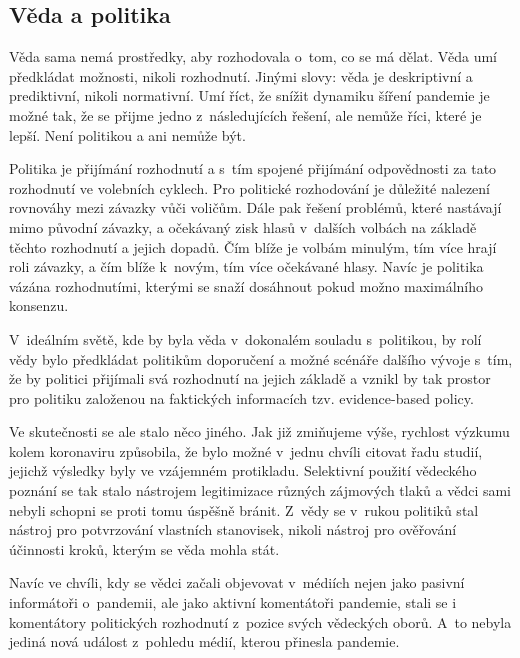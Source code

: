 \subsection*{Věda a politika}

Věda sama nemá prostředky, aby rozhodovala o~tom, co se má dělat. Věda umí předkládat možnosti, nikoli rozhodnutí. Jinými slovy: věda je deskriptivní a prediktivní, nikoli normativní. Umí říct, že snížit dynamiku šíření pandemie je možné tak, že se přijme jedno z~následujících řešení, ale nemůže říci, které je lepší. Není politikou a ani nemůže být.

Politika je přijímání rozhodnutí a s~tím spojené přijímání odpovědnosti za tato rozhodnutí ve volebních cyklech. Pro politické rozhodování je důležité nalezení rovnováhy mezi závazky vůči voličům. Dále pak řešení problémů, které nastávají mimo původní závazky, a očekávaný zisk hlasů v~dalších volbách na základě těchto rozhodnutí a jejich dopadů. Čím blíže je volbám minulým, tím více hrají roli závazky, a čím blíže k~novým, tím více očekávané hlasy. Navíc je politika vázána rozhodnutími, kterými se snaží dosáhnout pokud možno maximálního konsenzu.

\newpage

V~ideálním světě, kde by byla věda v~dokonalém souladu s~politikou, by rolí vědy bylo předkládat politikům doporučení a možné scénáře dalšího vývoje s~tím, že by politici přijímali svá rozhodnutí na jejich základě a vznikl by tak prostor pro politiku založenou na faktických informacích tzv. evidence-based policy.

Ve skutečnosti se ale stalo něco jiného. Jak již zmiňujeme výše, rychlost výzkumu kolem koronaviru způsobila, že bylo možné v~jednu chvíli citovat řadu studií, jejichž výsledky byly ve vzájemném protikladu. Selektivní použití vědeckého poznání se tak stalo nástrojem legitimizace různých zájmových tlaků a vědci sami nebyli schopni se proti tomu úspěšně bránit. Z~vědy se v~rukou politiků stal nástroj pro potvrzování vlastních stanovisek, nikoli nástroj pro ověřování účinnosti kroků, kterým se věda mohla stát.

Navíc ve chvíli, kdy se vědci začali objevovat v~médiích nejen jako pasivní informátoři o~pandemii, ale jako aktivní komentátoři pandemie, stali se i komentátory politických rozhodnutí z~pozice svých vědeckých oborů. A~to nebyla jediná nová událost z~pohledu médií, kterou přinesla pandemie.

\vspace{-0.6eM}

